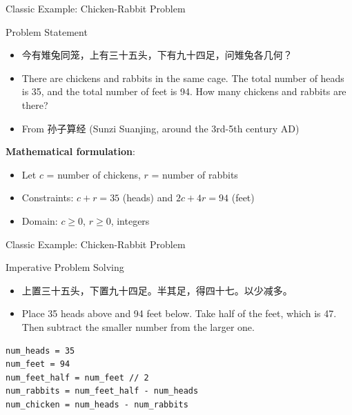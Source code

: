 \documentclass{beamer}
\begin{document}
\begin{frame}[t]{Classic Example: Chicken-Rabbit Problem}

\begin{block}{Problem Statement}
\begin{itemize}
    \item 今有雉兔同笼，上有三十五头，下有九十四足，问雉兔各几何？
    \item There are chickens and rabbits in the same cage. The total number of heads is 35, and the total number of feet is 94. How many chickens and rabbits are there?
    \item From 孙子算经 (Sunzi Suanjing, around the 3rd-5th century AD)
\end{itemize}
\end{block}

\textbf{Mathematical formulation}:
\begin{itemize}
\item Let $c$ = number of chickens, $r$ = number of rabbits
\item Constraints: $c + r = 35$ (heads) and $2c + 4r = 94$ (feet)
\item Domain: $c \geq 0$, $r \geq 0$, integers
\end{itemize}

\end{frame}

\begin{frame}[t,fragile]{Classic Example: Chicken-Rabbit Problem}

\begin{block}{Imperative Problem Solving}
\begin{itemize}
    \item 上置三十五头，下置九十四足。半其足，得四十七。以少减多。
    \item Place 35 heads above and 94 feet below.  Take half of the feet, which is 47.  Then subtract the smaller number from the larger one.
\end{itemize}

\end{block}

\scriptsize
\begin{verbatim}
num_heads = 35
num_feet = 94
num_feet_half = num_feet // 2
num_rabbits = num_feet_half - num_heads
num_chicken = num_heads - num_rabbits
\end{verbatim}

\end{frame}
\end{document}
